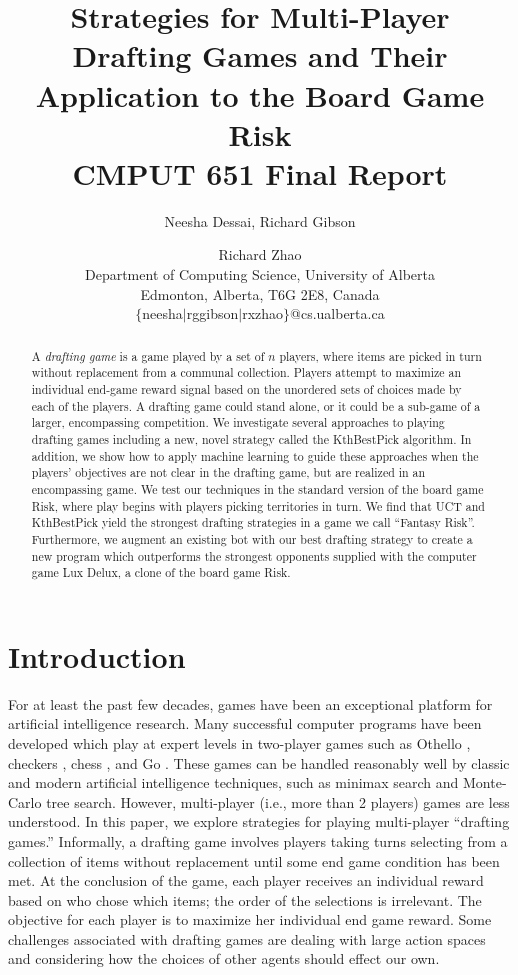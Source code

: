 \documentclass[letterpaper]{article}
\title{Strategies for Multi-Player Drafting Games and Their Application to the Board Game Risk \\ \small \vspace{0.1cm} CMPUT 651 Final Report}
\author{Neesha Dessai, Richard Gibson \and Richard Zhao \\
Department of Computing Science, University of Alberta \\
Edmonton, Alberta, T6G 2E8, Canada \\
$\{$neesha$\mid$rggibson$\mid$rxzhao$\}$@cs.ualberta.ca}
\numberwithin{equation}{section}
\numberwithin{theorem}{section}
\numberwithin{lemma}{section}
\numberwithin{df}{section}
\begin{document}
\maketitle

\begin{abstract}
A \emph{drafting game} is a game played by a set of $n$ players, where items are picked in turn without replacement from a communal collection.  Players attempt to maximize an individual end-game reward signal based on the unordered sets of choices made by each of the players.  A drafting game could stand alone, or it could be a sub-game of a larger, encompassing competition.  We investigate several approaches to playing drafting games including a new, novel strategy called the KthBestPick algorithm.  In addition, we show how to apply machine learning to guide these approaches when the players' objectives are not clear in the drafting game, but are realized in an encompassing game.  We test our techniques in the standard version of the board game Risk, where play begins with players picking territories in turn.  We find that UCT and KthBestPick yield the strongest drafting strategies in a game we call ``Fantasy Risk''.  Furthermore, we augment an existing bot with our best drafting strategy to create a new program which outperforms the strongest opponents supplied with the computer game Lux Delux, a clone of the board game Risk.
\end{abstract}

\section{Introduction}


For at least the past few decades, games have been an exceptional platform for artificial intelligence research.  Many successful computer programs have been developed which play at expert levels in two-player games such as Othello \cite{Othello}, checkers \cite{Chinook}, chess \cite{DeepBlue}, and Go \cite{ComputerGo}.  These games can be handled reasonably well by classic and modern artificial intelligence techniques, such as minimax search and Monte-Carlo tree search.  However, multi-player (i.e., more than 2 players) games are less understood.  In this paper, we explore strategies for playing multi-player ``drafting games.''  Informally, a drafting game involves players taking turns selecting from a collection of items without replacement until some end game condition has been met.  At the conclusion of the game, each player receives an individual reward based on who chose which items; the order of the selections is irrelevant.  The objective for each player is to maximize her individual end game reward.  Some challenges associated with drafting games are dealing with large action spaces and considering how the choices of other agents should effect our own.
\end{document}
